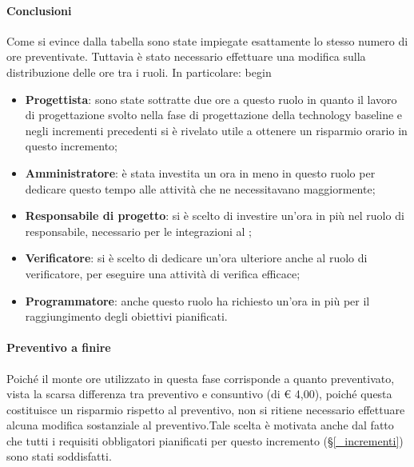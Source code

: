 \paragraph{Conclusioni}
Come si evince dalla tabella sono state impiegate esattamente lo stesso numero di ore preventivate. Tuttavia è stato necessario effettuare una modifica sulla distribuzione delle ore tra i ruoli. In particolare:
begin\begin{itemize}
	\item \textbf{Progettista}: sono state sottratte due ore a questo ruolo in quanto il lavoro di progettazione svolto nella fase di progettazione della technology baseline e negli incrementi precedenti si è rivelato utile a ottenere un risparmio orario in questo incremento;
	\item \textbf{Amministratore}: è stata investita un ora in meno in questo ruolo per dedicare questo tempo alle attività che ne necessitavano maggiormente;
	\item \textbf{Responsabile di progetto}: si è scelto di investire un'ora in più nel ruolo di responsabile, necessario per le integrazioni al ;
	\item \textbf{Verificatore}: si è scelto di dedicare un'ora ulteriore anche al ruolo di verificatore, per eseguire una attività di verifica efficace;
	\item \textbf{Programmatore}: anche questo ruolo ha richiesto un'ora in più per il raggiungimento degli obiettivi pianificati.
\end{itemize} 

\paragraph{Preventivo a finire}
Poiché il monte ore utilizzato in questa fase corrisponde a quanto preventivato, vista la scarsa differenza tra preventivo e consuntivo (di € 4,00), poiché questa costituisce un risparmio rispetto al preventivo, non si ritiene necessario effettuare alcuna modifica sostanziale al preventivo.Tale scelta è motivata anche dal fatto che tutti i requisiti obbligatori pianificati per questo incremento (\S\ref{_incrementi}) sono stati soddisfatti. 

